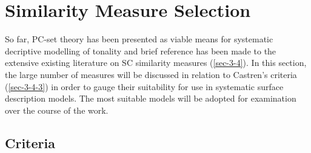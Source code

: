 \documentclass{article}
\begin{document}
\section{Similarity Measure Selection}
\label{sec-6}

So far, PC-set theory has been presented as viable means for
systematic decriptive modelling of tonality and brief reference has
been made to the extensive existing literature on SC similarity
measures (\ref{sec-3-4}). In this section, the large number of
measures will be discussed in relation to Castren's criteria
(\ref{sec-3-4-3}) in order to gauge their suitability for use in
systematic surface description models. The most suitable models will
be adopted for examination over the course of the work.
\subsection{Criteria}
\label{sec-6-1}
\end{document}
